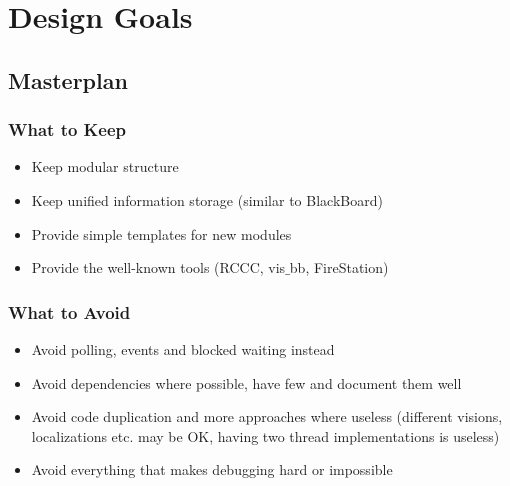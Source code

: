 %
%
%

\section{Design Goals}



\subsection{Masterplan}
\begin{frame}
  \frametitle{What to Keep}
  \begin{itemize}
  \item Keep modular structure
  \item Keep unified information storage (similar to BlackBoard)
  \item Provide simple templates for new modules
  \item Provide the well-known tools (RCCC, vis$\_$bb, FireStation)
  \end{itemize}
\end{frame}

\begin{frame}
  \frametitle{What to Avoid}
  \begin{itemize}
  \item Avoid polling, events and blocked waiting instead
  \item Avoid dependencies where possible, have few and document them well
  \item Avoid code duplication and more approaches where useless
    (different visions, localizations etc. may be OK, having two thread implementations
    is useless)
  \item Avoid everything that makes debugging hard or impossible
  \end{itemize}
\end{frame}

